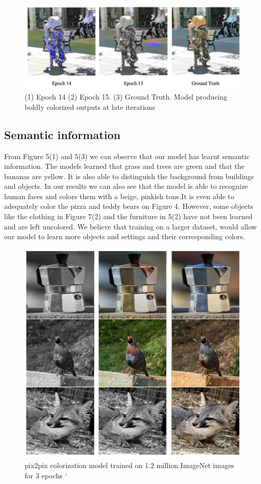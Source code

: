 \documentclass[10pt,twocolumn,letterpaper]{article}
\begin{document}
\begin{figure}
    \centering
    \includegraphics[width=0.5\linewidth]{epoch14_15.png}
    \caption{(1) Epoch 14 (2) Epoch 15. (3) Ground Truth. Model producing boldly colorized outputs at late iterations}
    \label{fig:enter-label}
\end{figure}

\subsection{Semantic information} 
From Figure 5(1) and 5(3) we can observe that our model has learnt semantic information. The models learned that grass and trees are green and that the bananas are yellow. It is also able to distinguish the background from buildings and objects. In our results we can also see that the model is able to recognize human faces and colors them with a beige, pinkish tone.It is even able to adequately color the pizza and teddy bears on Figure 4.  However, some objects like the clothing in Figure 7(2) and the furniture in 5(2) have not been learned and are left uncolored. We believe that training on a larger dataset, would allow our model to learn more objects and settings and their corresponding colors.
\begin{figure}
    \centering
    \includegraphics[width=0.5\linewidth]{pix2pix colorization.png}
    \caption{pix2pix colorization model trained on 1.2 million ImageNet images for 3 epochs `\cite{Pix2Pix}}
    \label{fig:enter-label}
\end{figure}
\end{document}
